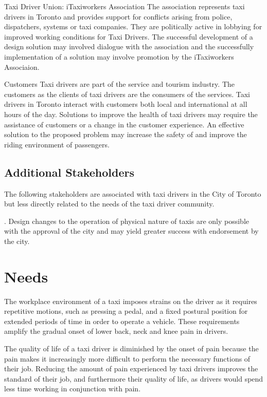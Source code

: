\documentclass[11pt]{article}
\begin{document}
Taxi Driver Union: iTaxiworkers Association 
The association represents taxi drivers in Toronto and provides 
support for conflicts arising from police, dispatchers, systems or 
taxi companies. They are politically active in lobbying for improved 
working conditions for Taxi Drivers. The successful development of a 
design solution may involved dialogue with the association and the 
successfully implementation of a solution may involve promotion by the 
iTaxiworkers Associaion\cite{itaxi}. 

Customers 
Taxi drivers are part of the service and tourism industry. The customers 
as the clients of taxi drivers are the consumers of the services. Taxi 
drivers in Toronto interact with customers both local and international 
at all hours of the day. Solutions to improve the health of taxi drivers 
may require the assistance of customers or a change in the customer 
experience. An effective solution to the proposed problem may increase 
the safety of and improve the riding environment of passengers. 
 
\subsection{Additional Stakeholders}

The following stakeholders are associated with taxi drivers in the City 
of Toronto but less directly related to the needs of the taxi driver 
community. 


\cite{CityofToronto}. Design changes to the operation of physical
nature of taxis are only possible with the approval of the city and
may yield greater success with endorsement by the city.

\section{Needs}
\label{sec:needs}
The workplace environment of a taxi imposes strains on the driver as it
requires repetitive motions, such as pressing a pedal, and a fixed postural
position for extended periods of time in order to operate a
vehicle. These requirements amplify the gradual onset of lower
back, neck and knee pain in drivers\cite{POSTULATED}. 

The quality of life of a taxi driver is diminished
by the onset of pain because the pain makes it increasingly more difficult to perform the 
necessary functions of their job. Reducing the amount of pain
experienced by taxi drivers improves the standard of their job, and
furthermore their quality of life, as drivers would spend
less time working in conjunction with pain.
\end{document}
